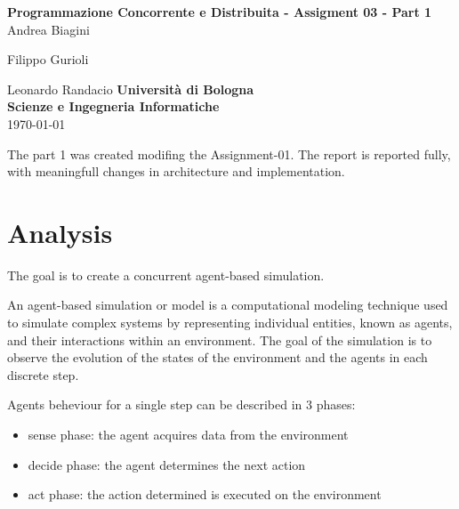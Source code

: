 \documentclass[12pt, a4paper]{report}
\begin{document}
\renewcommand\bibname{References} %


\begin{titlepage}

\begin{center}

\Large \textbf {Programmazione Concorrente e Distribuita - Assigment 03 - Part 1}\\%
\vspace{1em}%
\vfill
Andrea Biagini


Filippo Gurioli


Leonardo Randacio
\vspace{1em}
\vfill
{\bf Università di Bologna \\ Scienze e Ingegneria Informatiche}\\[0.5in]

       
\vfill
\today

\end{center}

\end{titlepage}


\tableofcontents

\newpage
{} %

The part 1 was created modifing the Assignment-01. The report is reported fully, with meaningfull changes in architecture and implementation.

\chapter{Analysis}
The goal is to create a concurrent agent-based simulation.

An agent-based simulation or model is a computational modeling
 technique used to simulate complex systems by representing individual
 entities, known as agents, and their interactions within an environment.
 The goal of the simulation is to observe the evolution of the states of the
 environment and the agents in each discrete step.

Agents beheviour for a single step can be described in 3 phases:
\begin{itemize}
   \item sense phase: the agent acquires data from the environment
   \item decide phase: the agent determines the next action
   \item act phase: the action determined is executed on the environment
\end{itemize}
\end{document}
